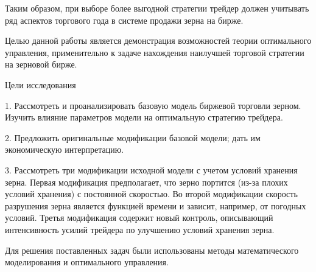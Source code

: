 Таким образом, при выборе более выгодной стратегии трейдер должен учитывать ряд аспектов торгового года в системе продажи зерна на бирже.


Целью данной работы является демонстрация возможностей теории оптимального управления, применительно к задаче нахождения наилучшей торговой стратегии на зерновой бирже.


Цели исследования


1. Рассмотреть и проанализировать базовую модель биржевой торговли зерном. Изучить влияние параметров модели на оптимальную стратегию трейдера.


2. Предложить оригинальные модификации базовой модели; дать им экономическую интерпретацию.


3. Рассмотреть три модификации исходной модели с учетом условий хранения зерна. Первая модификация предполагает, что зерно портится (из-за плохих условий хранения) с постоянной скоростью. Во второй модификации скорость разрушения зерна является функцией времени и зависит, например, от погодных условий. Третья модификация содержит новый контроль, описывающий интенсивность усилий трейдера по улучшению условий хранения зерна.


Для решения поставленных задач были использованы методы математического моделирования и оптимального управления.
